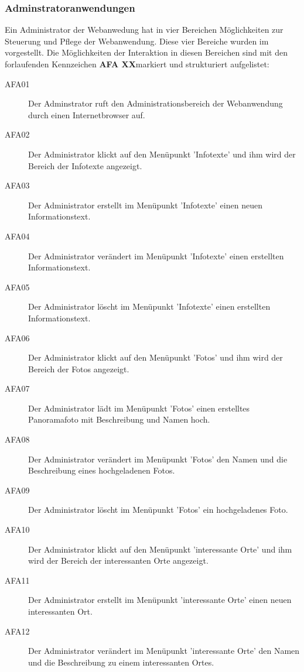 \subsubsection{Adminstratoranwendungen}
\label{sec:Adminstratoranwendungen}

Ein Administrator der Webanwedung hat in vier Bereichen Möglichkeiten zur Steuerung und Pflege der Webanwendung. Diese vier Bereiche wurden im  vorgestellt. Die Möglichkeiten der Interaktion in diesen Bereichen sind mit den forlaufenden Kennzeichen \textbf{AFA XX}\footnotemark markiert und strukturiert aufgelistet:


\begin{description}
  \item[AFA01] Der Adminstrator ruft den Administrationsbereich der Webanwendung durch einen Internetbrowser auf.
  \item[AFA02] Der Administrator klickt auf den Menüpunkt 'Infotexte' und ihm wird der Bereich der Infotexte angezeigt.
  \item[AFA03] Der Administrator erstellt im Menüpunkt 'Infotexte' einen neuen Informationstext.
  \item[AFA04] Der Administrator verändert im Menüpunkt 'Infotexte' einen erstellten Informationstext.
  \item[AFA05] Der Administrator löscht im Menüpunkt 'Infotexte' einen erstellten Informationstext.
  \item[AFA06] Der Administrator klickt auf den Menüpunkt 'Fotos' und ihm wird der Bereich der Fotos angezeigt.
  \item[AFA07] Der Administrator lädt im Menüpunkt 'Fotos' einen erstelltes Panoramafoto mit Beschreibung und Namen hoch.
  \item[AFA08] Der Administrator verändert im Menüpunkt 'Fotos' den Namen und die Beschreibung eines hochgeladenen Fotos.
  \item[AFA09] Der Administrator löscht im Menüpunkt 'Fotos' ein hochgeladenes Foto.
  \item[AFA10] Der Administrator klickt auf den Menüpunkt 'interessante Orte' und ihm wird der Bereich der interessanten Orte angezeigt.
  \item[AFA11] Der Administrator erstellt im Menüpunkt 'interessante Orte' einen neuen interessanten Ort.
  \item[AFA12] Der Administrator verändert im Menüpunkt 'interessante Orte' den Namen und die Beschreibung zu einem interessanten Ortes.

\end{description}
